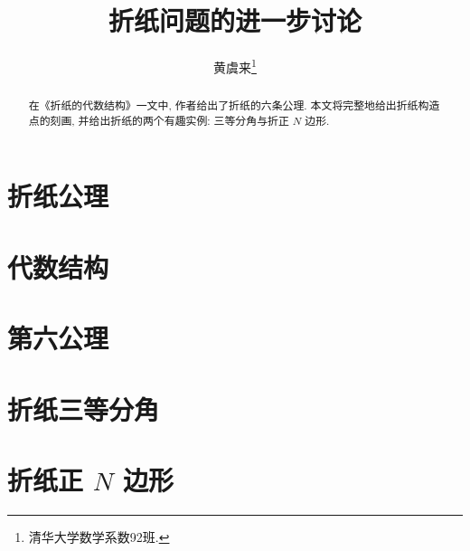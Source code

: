 \documentclass[twoside]{article}
\begin{document}
\title{折纸问题的进一步讨论}
\author{黄虞来\footnote{清华大学数学系数92班.}}

\begin{abstract}
    在《折纸的代数结构》\cite{Hesi}一文中, 作者给出了折纸的六条公理.
    本文将完整地给出折纸构造点的刻画,
    并给出折纸的两个有趣实例: 三等分角与折正 $N$ 边形.
\end{abstract}

\section{折纸公理}



\section{代数结构}



\section{第六公理}



\section{折纸三等分角}



\section{折纸正 \texorpdfstring{$N$}{N} 边形}



\printbibliography
\end{document}
